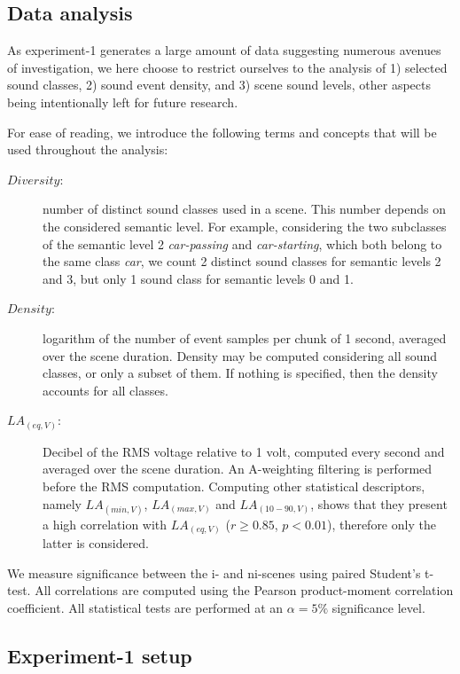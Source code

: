\documentclass[twoside,twocolumn]{article}
\begin{document}
\subsection{Data analysis}

As experiment-1 generates a large amount of data suggesting numerous avenues of investigation, we here choose to restrict ourselves to the analysis of 1) selected sound classes, 2) sound event density, and 3) scene sound levels, other aspects being intentionally left for future research.

For ease of reading, we introduce the following terms and concepts that will be used throughout the analysis: 
\begin{description}
\item[$Diversity$:] number of distinct sound classes used in a scene. This number depends on the considered semantic level. For example, considering the two subclasses of the semantic level 2 \textit{car-passing} and \textit{car-starting}, which both belong to the same class \textit{car}, we count 2 distinct sound classes for semantic levels 2 and 3, but only 1 sound class for semantic levels 0 and 1. 
\item[$Density$:] logarithm of the number of event samples per chunk of 1 second, averaged over the scene duration. Density may be computed considering all sound classes, or only a subset of them. If nothing is specified, then the density accounts for all classes.
\item[$LA_{(eq,V)}$:]  Decibel of the RMS voltage relative to 1 volt, computed every second and averaged over the scene duration. An A-weighting filtering is performed before the RMS computation. Computing other statistical descriptors, namely $LA_{(min,V)}$, $LA_{(max,V)}$ and $LA_{(10-90,V)}$, shows that they present a high correlation with $LA_{(eq,V)}$ ($r\geq0.85$, $p<0.01$), therefore only the latter is considered.
\end{description}

We measure significance between the i- and ni-scenes using paired Student's t-test. All correlations are computed using the Pearson product-moment correlation coefficient. All statistical tests are performed at an $\alpha=5\%$ significance level.



\subsection{Experiment-1 setup}
\end{document}
